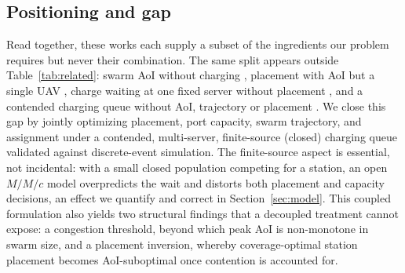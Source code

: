 \subsection{Positioning and gap}
Read together, these works each supply a subset of the ingredients our problem
requires but never their combination. The same split appears outside Table~\ref{tab:related}: swarm AoI without charging
\cite{eldeeb2023swarm}, placement with AoI but a single UAV \cite{base2024}, charge
waiting at one fixed server without placement \cite{wei2024}, and a contended charging
queue without AoI, trajectory or placement \cite{ev2022sharing}. We close this gap by jointly optimizing placement, port
capacity, swarm trajectory, and assignment under a contended, multi-server,
finite-source (closed) charging queue validated against discrete-event simulation.
The finite-source aspect is essential, not incidental: with a small closed
population competing for a station, an open $M/M/c$ model overpredicts the wait and
distorts both placement and capacity decisions, an effect we quantify and correct in
Section~\ref{sec:model}. This coupled formulation also yields two
structural findings that a decoupled treatment cannot expose: a congestion
threshold, beyond which peak AoI is non-monotone in swarm size, and a
placement inversion, whereby coverage-optimal station placement becomes
AoI-suboptimal once contention is accounted for.
